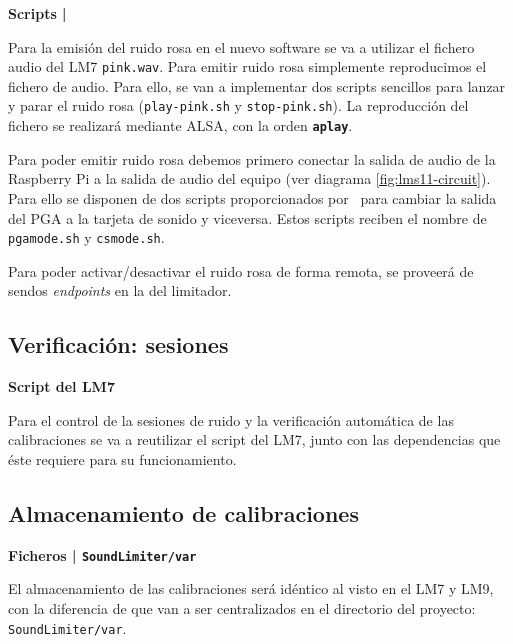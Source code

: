 \begin{flushright}
\textbf{Scripts | }
\end{flushright}

Para la emisión del ruido rosa en el nuevo software se va a utilizar el fichero audio del \acrshort{LM7} \texttt{pink.wav}. Para emitir ruido rosa simplemente reproducimos el fichero de audio. Para ello, se van a implementar dos scripts sencillos para lanzar y parar el ruido rosa (\texttt{play-pink.sh} y \texttt{stop-pink.sh}). La reproducción del fichero se realizará mediante \acrshort{ALSA}, con la orden \texttt{\textbf{aplay}}.

Para poder emitir ruido rosa debemos primero conectar la salida de audio de la Raspberry Pi a la salida de audio del equipo (ver diagrama \ref{fig:lms11-circuit}). Para ello se disponen de dos scripts proporcionados por \myMateLuis\ para cambiar la salida del \acrshort{PGA} a la tarjeta de sonido y viceversa. Estos scripts reciben el nombre de \texttt{pgamode.sh} y \texttt{csmode.sh}.

Para poder activar/desactivar el ruido rosa de forma remota, se proveerá de sendos \textit{endpoints} en la  del limitador.

\subsection{Verificación: sesiones}

\begin{flushright}
\textbf{Script del \acrshort{LM7}}
\end{flushright}

Para el control de la sesiones de ruido y la verificación automática de las calibraciones se va a reutilizar el script del \acrshort{LM7}, junto con las dependencias que éste requiere para su funcionamiento.

\subsection{Almacenamiento de calibraciones}

\begin{flushright}
\textbf{Ficheros | \texttt{SoundLimiter/var}}
\end{flushright}

El almacenamiento de las calibraciones será idéntico al visto en el \acrshort{LM7} y \acrshort{LM9}, con la diferencia de que van a ser centralizados en el directorio del proyecto:\\ \texttt{SoundLimiter/var}.

